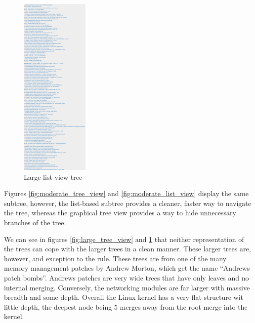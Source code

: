 \documentclass[conference, draftclsnofoot]{IEEEtran}
\begin{document}
\begin{figure}[h]
	\centering
	\includegraphics[height=3.5in]{figures/list_viewer_large.png}
	\caption{Large list view tree}
	\label{fig:large_list_view}
\end{figure}


Figures \ref{fig:moderate_tree_view} and \ref{fig:moderate_list_view} display
the same subtree, however, the list-based subtree provides a cleaner, faster
way to navigate the tree, whereas the graphical tree view provides a way to
hide unnecessary branches of the tree.

We can see in figures \ref{fig:large_tree_view} and \ref{fig:large_list_view}
that neither representation of the trees can cope with the larger trees in a
clean manner. These larger trees are, however, and exception to the rule. These
trees are from one of the many memory management patches by Andrew Morton,
which get the name ``Andrews patch bombs''. Andrews patches are very wide trees
that have only leaves and no internal merging. Conversely, the networking
modules are far larger with massive breadth and some depth. Overall the Linux
kernel has a very flat structure wit little depth, the deepest node being $5$
merges away  from the root merge into the kernel.


\end{document}
